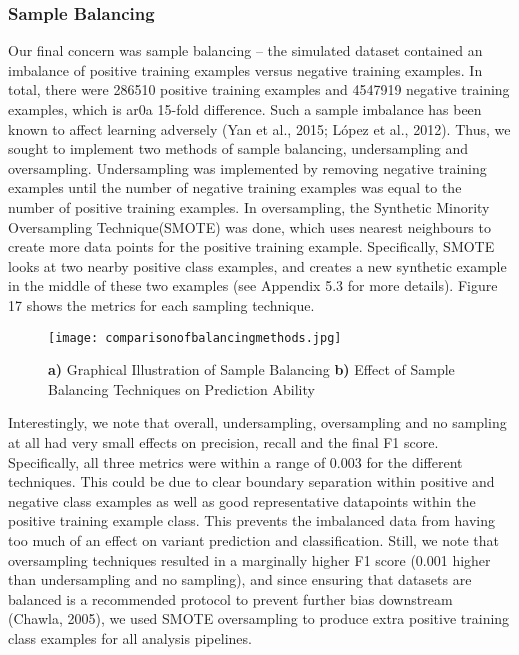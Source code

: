 \documentclass{article}
\begin{document}
\subsubsection{Sample Balancing}
Our final concern was sample balancing -- the simulated dataset contained an imbalance of positive training examples versus negative training examples. In total, there were 286510 positive training examples and 4547919 negative training examples, which is ar0a 15-fold difference. Such a sample imbalance has been known to affect learning adversely (Yan et al., 2015; López et al., 2012). Thus, we sought to implement two methods of sample balancing, undersampling and oversampling. Undersampling was implemented by removing negative training examples until the number of negative training examples was equal to the number of positive training examples. In oversampling, the Synthetic Minority Oversampling Technique(SMOTE) was done, which uses nearest neighbours to create more data points for the positive training example. Specifically, SMOTE looks at two nearby positive class examples, and creates a new synthetic example in the middle of these two examples (see Appendix 5.3 for more details). Figure 17 shows the metrics for each sampling technique.
\begin{figure}[H]
\centering
\texttt{[image: comparisonofbalancingmethods.jpg]}
\caption{\textbf{a)} Graphical Illustration of Sample Balancing \textbf{b)} Effect of Sample Balancing Techniques on Prediction Ability}
\end{figure}
Interestingly, we note that overall, undersampling, oversampling and no sampling at all had very small effects on precision, recall and the final F1 score. Specifically, all three metrics were within a range of 0.003 for the different techniques. This could be due to clear boundary separation within positive and negative class examples as well as good representative datapoints within the positive training example class. This prevents the imbalanced data from having too much of an effect on variant prediction and classification. Still, we note that oversampling techniques resulted in a marginally higher F1 score (0.001 higher than undersampling and no sampling), and since ensuring that datasets are balanced is a recommended protocol to prevent further bias downstream (Chawla, 2005), we used SMOTE oversampling to produce extra positive training class examples for all analysis pipelines.
\end{document}
